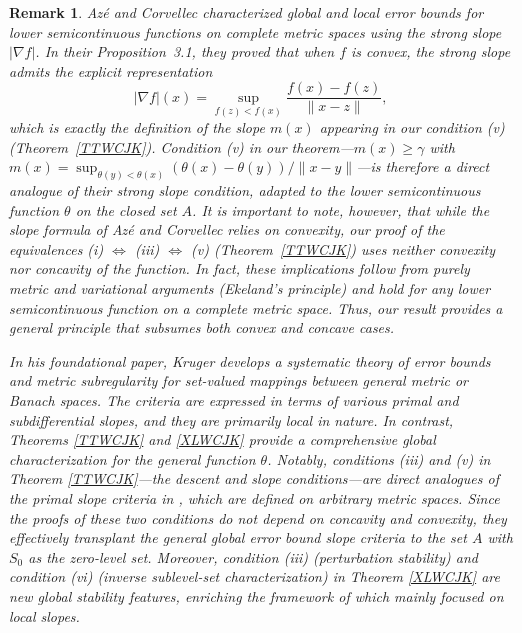 \documentclass[11pt]{article}
\newtheorem{remark}{Remark}[section]
\begin{document}
\begin{remark}
	
	Az\'e and Corvellec   \cite{AC2004}   characterized global and local error bounds for lower semicontinuous functions on complete metric spaces using the strong slope \(|\nabla f|\). In their Proposition~3.1, they proved that when \(f\) is convex, the strong slope admits the explicit representation
	\[
	|\nabla f|(x) = \sup_{f(z) < f(x)} \frac{f(x) - f(z)}{\|x - z\|},
	\]
	which is exactly the definition of the slope \(m(x)\) appearing in our condition (v) (Theorem~\ref{TTWCJK}). Condition (v) in our theorem---\(m(x)\ge \gamma\) with \(m(x)=\sup_{\theta(y)<\theta(x)}(\theta(x)-\theta(y))/\|x-y\|\)---is therefore a direct analogue of their strong slope condition, adapted to the   lower semicontinuous function \(\theta\) on the closed set \(A\). It is important to note, however, that while the slope formula of Az\'e and Corvellec relies on convexity, our proof of the equivalences (i) \(\Leftrightarrow\) (iii) \(\Leftrightarrow\) (v) (Theorem~\ref{TTWCJK}) uses neither convexity nor concavity of the function. In fact, these implications follow from purely metric and variational arguments (Ekeland's principle) and hold for any lower semicontinuous function on a complete metric space. Thus, our result   provides a general principle that subsumes both convex and concave cases.
	
	
	
	
	In his foundational paper, Kruger   \cite{Kruger}   develops a systematic theory of error bounds and metric subregularity for set-valued mappings between general metric or Banach spaces. The criteria are expressed in terms of various primal and subdifferential slopes, and they are primarily \emph{local} in nature. In contrast, Theorems \ref{TTWCJK} and \ref{XLWCJK} provide a comprehensive \emph{global} characterization for the general function  $\theta$. 
	Notably, conditions (iii) and (v) in Theorem \ref{TTWCJK}---the descent and slope conditions---are direct analogues of the primal slope criteria in    \cite{Kruger}, which are defined on arbitrary metric spaces. Since the proofs of these two conditions do not depend on concavity and convexity, they effectively transplant the general global error bound slope criteria to the   set \(A\) with \(S_0\) as the zero-level set.   Moreover, condition (iii) (perturbation stability) and condition (vi) (inverse sublevel-set characterization) in Theorem \ref{XLWCJK} are new global stability features, enriching the framework of    \cite{Kruger} which mainly focused on local slopes.
	

\end{remark}
\end{document}
